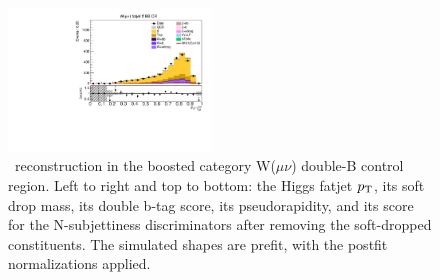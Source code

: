 \begin{figure}[tbp]
\begin{center}
    \includegraphics[width=0.48\textwidth]{figures/wlnhbb2016/boosted/WmnWHTT2bFJCR_fj1Tau32SD.pdf}
    \caption{\HBB\ reconstruction in the boosted category W($\mu\nu$) double-B control region.
    Left to right and top to bottom: the Higgs fatjet $p_{\mathrm{T}}$, its soft drop mass, its
    double b-tag score, its pseudorapidity, and its score for the N-subjettiness discriminators
    after removing the soft-dropped constituents.
    The simulated shapes are prefit, with the postfit normalizations applied.}
    \label{fig:boost_WmnTT2b_Hbb}
  \end{center}
\end{figure}
\clearpage

